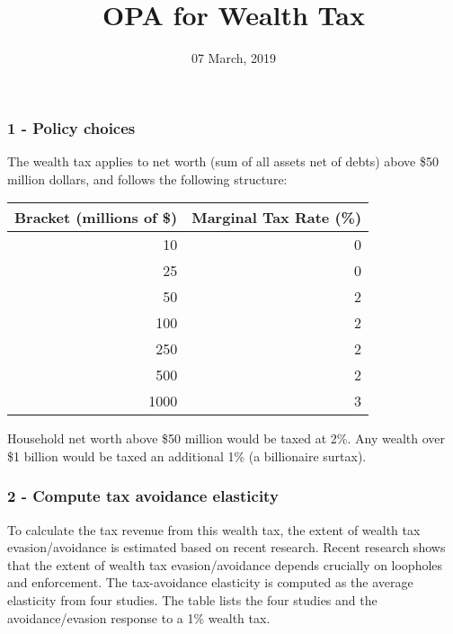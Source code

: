 \documentclass[]{article}
\title{OPA for Wealth Tax}
\author{}
\date{07 March, 2019}
\begin{document}
\maketitle

\hypertarget{policy-choices}{%
\subsubsection{1 - Policy choices}\label{policy-choices}}

The wealth tax applies to net worth (sum of all assets net of debts)
above \$50 million dollars, and follows the following structure:

\begin{table}[H]
\centering
\begin{tabular}{r|r}
\hline
Bracket (millions of \$) & Marginal Tax Rate (\%)\\
\hline
10 & 0\\
\hline
25 & 0\\
\hline
50 & 2\\
\hline
100 & 2\\
\hline
250 & 2\\
\hline
500 & 2\\
\hline
1000 & 3\\
\hline
\end{tabular}
\end{table}

Household net worth above \$50 million would be taxed at 2\%. Any wealth
over \$1 billion would be taxed an additional 1\% (a billionaire
surtax).

\hypertarget{compute-tax-avoidance-elasticity}{%
\subsubsection{2 - Compute tax avoidance
elasticity}\label{compute-tax-avoidance-elasticity}}

To calculate the tax revenue from this wealth tax, the extent of wealth
tax evasion/avoidance is estimated based on recent research. Recent
research shows that the extent of wealth tax evasion/avoidance depends
crucially on loopholes and enforcement. The tax-avoidance elasticity is
computed as the average elasticity from four studies. The table lists
the four studies and the avoidance/evasion response to a 1\% wealth tax.
\end{document}

